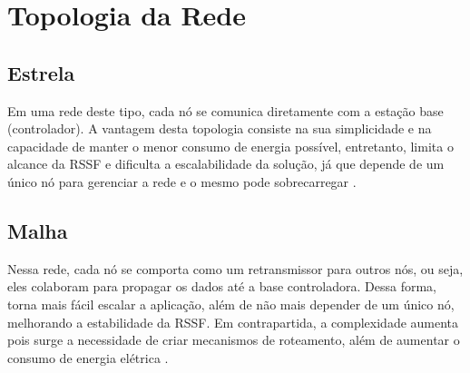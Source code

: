 \section{Topologia da Rede}
\subsection{Estrela}
Em uma rede deste tipo, cada nó se comunica diretamente com a estação base (controlador). A vantagem
desta topologia consiste na sua simplicidade e na capacidade de manter o menor consumo de energia possível,
entretanto, limita o alcance da RSSF e dificulta a escalabilidade da solução, já que depende de um único nó
para gerenciar a rede e o mesmo pode sobrecarregar \cite{dargie_poellabauer2010,townsend_arms2005}.

\subsection{Malha}
Nessa rede, cada nó se comporta como um retransmissor para outros nós, ou seja, eles colaboram para propagar
os dados até a base controladora. Dessa forma, torna mais fácil escalar a aplicação, além de não mais
depender de um único nó, melhorando a estabilidade da RSSF. Em contrapartida, a complexidade aumenta pois
surge a necessidade de criar mecanismos de roteamento, além de aumentar o consumo de energia elétrica
\cite{dargie_poellabauer2010,townsend_arms2005}.
